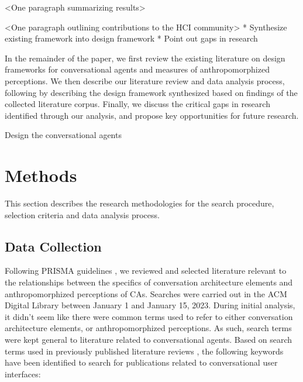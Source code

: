 \documentclass[sigconf,screen,review, anonymous]{acmart}
\begin{document}
<One paragraph summarizing results>

<One paragraph outlining contributions to the HCI community>
* Synthesize existing framework into design framework \newline
* Point out gaps in research \newline

In the remainder of the paper, we first review the existing literature on design frameworks for conversational agents and measures of anthropomorphized perceptions. We then describe our literature review and data analysis process, following by describing the design framework synthesized based on findings of the collected literature corpus. Finally, we discuss the critical gaps in research identified through our analysis, and propose key opportunities for future research.


Design the conversational agents








\section{Methods}

This section describes the research methodologies for the search procedure, selection criteria and data analysis process.

\subsection{Data Collection}

Following PRISMA guidelines \cite{prisma}, we reviewed and selected literature relevant to the relationships between the specifics of conversation architecture elements and anthropomorphized perceptions of CAs. Searches were carried out in the ACM Digital Library between January 1 and January 15, 2023. During initial analysis, it didn't seem like there were common terms used to refer to either conversation architecture elements, or anthropomorphized perceptions. As such, search terms were kept general to literature related to conversational agents. Based on search terms used in previously published literature reviews \cite{clark2019state}\cite{rapp2021human} , the following keywords have been identified to search for publications related to conversational user interfaces:
\newline
\end{document}
